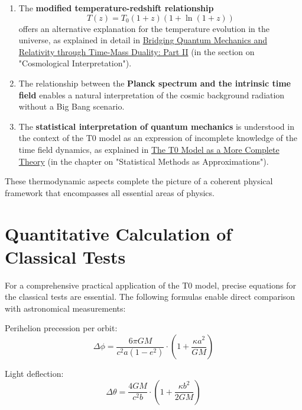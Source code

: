 \documentclass[12pt,a4paper]{article}
\begin{document}
	\begin{enumerate}
		\item The \textbf{modified temperature-redshift relationship}
		\begin{equation}
			T(z) = T_0 (1+z)(1+\ln(1+z))
		\end{equation}
		offers an alternative explanation for the temperature evolution in the universe, as explained in detail in \href{https://github.com/jpascher/T0-Time-Mass-Duality/tree/main/2/pdf/English/QMRelTimeMassPart2En.pdf}{Bridging Quantum Mechanics and Relativity through Time-Mass Duality: Part II} (in the section on "Cosmological Interpretation").
		
		\item The relationship between the \textbf{Planck spectrum and the intrinsic time field} enables a natural interpretation of the cosmic background radiation without a Big Bang scenario.
		
		\item The \textbf{statistical interpretation of quantum mechanics} is understood in the context of the T0 model as an expression of incomplete knowledge of the time field dynamics, as explained in \href{https://github.com/jpascher/T0-Time-Mass-Duality/tree/main/2/pdf/English/T0-ModelAsCompleteTheory_En.pdf}{The T0 Model as a More Complete Theory} (in the chapter on "Statistical Methods as Approximations").
	\end{enumerate}
	
	These thermodynamic aspects complete the picture of a coherent physical framework that encompasses all essential areas of physics.
	
	\section{Quantitative Calculation of Classical Tests}
	\label{subsec:classical_tests}
	
	For a comprehensive practical application of the T0 model, precise equations for the classical tests are essential. The following formulas enable direct comparison with astronomical measurements:
	
	Perihelion precession per orbit:
	\begin{equation}
		\Delta\phi = \frac{6\pi GM}{c^2a(1-e^2)} \cdot \left(1 + \frac{\kappa a^2}{GM}\right)
	\end{equation}
	
	Light deflection:
	\begin{equation}
		\Delta\theta = \frac{4GM}{c^2b} \cdot \left(1 + \frac{\kappa b^2}{2GM}\right)
	\end{equation}
	
\end{document}
